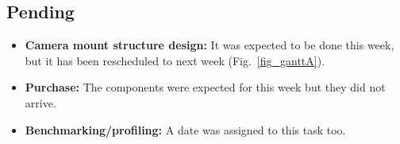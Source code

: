\subsection{Pending}

\begin{itemize}
	\item \textbf{Camera mount structure design:} It was expected to be done this week, but it has been rescheduled to next week (Fig.~\ref{fig_ganttA}).
	\item \textbf{Purchase:} The components were expected for this week but they did not arrive.
	\item \textbf{Benchmarking/profiling:} A date was assigned to this task too. 
\end{itemize}
